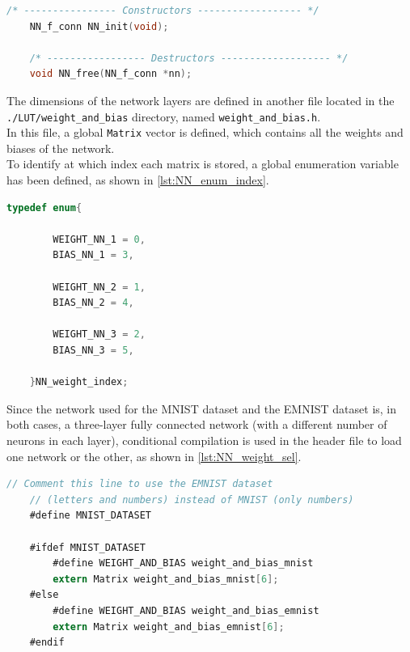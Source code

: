 \vspace{1em}
\begin{lstlisting}[language=C, caption={Constructors and Destructor}, label={lst:NN_constr_destr}, morekeywords={NN\_f\_conn, Matrix}, alsoletter={\_}]
    /* ---------------- Constructors ------------------ */
    NN_f_conn NN_init(void);

    /* ----------------- Destructors ------------------- */
    void NN_free(NN_f_conn *nn);
\end{lstlisting}

\noindent
The dimensions of the network layers are defined in another file located in the \texttt{./LUT/weight\_and\_bias} directory, named \texttt{weight\_and\_bias.h}. \\
In this file, a global \texttt{Matrix} vector is defined, which contains all the weights and biases of the network. \\
To identify at which index each matrix is stored, a global enumeration variable has been defined, as shown in \autoref{lst:NN_enum_index}.

\vspace{1em}
\begin{lstlisting}[language=C, caption={Enumerate variable to identify the NN index}, label={lst:NN_enum_index}, morekeywords={NN\_weight\_index}, alsoletter={\_}]
    typedef enum{
        
        WEIGHT_NN_1 = 0,
        BIAS_NN_1 = 3,
    
        WEIGHT_NN_2 = 1,
        BIAS_NN_2 = 4,
    
        WEIGHT_NN_3 = 2,
        BIAS_NN_3 = 5,
    
    }NN_weight_index;
\end{lstlisting}

\noindent
Since the network used for the MNIST dataset and the EMNIST dataset is, in both cases, a three-layer fully connected network (with a different number of neurons in each layer), conditional compilation is used in the header file to load one network or the other, as shown in \autoref{lst:NN_weight_sel}.

\vspace{1em}
\begin{lstlisting}[language=C, caption={NN selection with conditional compilation}, label={lst:NN_weight_sel}, morekeywords={Matrix,\#include,\#define,\#ifdef,\#ifndef,\#else,\#endif}, alsoletter={\#}]
    // Comment this line to use the EMNIST dataset
    // (letters and numbers) instead of MNIST (only numbers)
    #define MNIST_DATASET

    #ifdef MNIST_DATASET
        #define WEIGHT_AND_BIAS weight_and_bias_mnist
        extern Matrix weight_and_bias_mnist[6];
    #else
        #define WEIGHT_AND_BIAS weight_and_bias_emnist
        extern Matrix weight_and_bias_emnist[6];
    #endif
\end{lstlisting}

